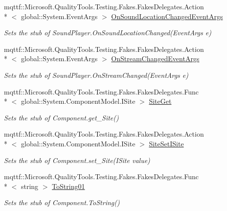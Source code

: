 \begin{DoxyCompactItemize}
mqttf\-::\-Microsoft.\-Quality\-Tools.\-Testing.\-Fakes.\-Fakes\-Delegates.\-Action\\*
$<$ global\-::\-System.\-Event\-Args $>$ \hyperlink{class_system_1_1_media_1_1_fakes_1_1_stub_sound_player_aec86b91a0eb444e299560a898fdcaa4c}{On\-Sound\-Location\-Changed\-Event\-Args}
\begin{DoxyCompactList}\small\item\em Sets the stub of Sound\-Player.\-On\-Sound\-Location\-Changed(\-Event\-Args e)\end{DoxyCompactList}\item 
mqttf\-::\-Microsoft.\-Quality\-Tools.\-Testing.\-Fakes.\-Fakes\-Delegates.\-Action\\*
$<$ global\-::\-System.\-Event\-Args $>$ \hyperlink{class_system_1_1_media_1_1_fakes_1_1_stub_sound_player_a680549744b5cd2e0d578aedaf750e229}{On\-Stream\-Changed\-Event\-Args}
\begin{DoxyCompactList}\small\item\em Sets the stub of Sound\-Player.\-On\-Stream\-Changed(\-Event\-Args e)\end{DoxyCompactList}\item 
mqttf\-::\-Microsoft.\-Quality\-Tools.\-Testing.\-Fakes.\-Fakes\-Delegates.\-Func\\*
$<$ global\-::\-System.\-Component\-Model.\-I\-Site $>$ \hyperlink{class_system_1_1_media_1_1_fakes_1_1_stub_sound_player_aa1edf1cb536d521b813b41f70039a644}{Site\-Get}
\begin{DoxyCompactList}\small\item\em Sets the stub of Component.\-get\-\_\-\-Site()\end{DoxyCompactList}\item 
mqttf\-::\-Microsoft.\-Quality\-Tools.\-Testing.\-Fakes.\-Fakes\-Delegates.\-Action\\*
$<$ global\-::\-System.\-Component\-Model.\-I\-Site $>$ \hyperlink{class_system_1_1_media_1_1_fakes_1_1_stub_sound_player_aa23ba87f9cd29af144dddce337b3127d}{Site\-Set\-I\-Site}
\begin{DoxyCompactList}\small\item\em Sets the stub of Component.\-set\-\_\-\-Site(\-I\-Site value)\end{DoxyCompactList}\item 
mqttf\-::\-Microsoft.\-Quality\-Tools.\-Testing.\-Fakes.\-Fakes\-Delegates.\-Func\\*
$<$ string $>$ \hyperlink{class_system_1_1_media_1_1_fakes_1_1_stub_sound_player_a3686ecc06d366e84574847a8baf11ebe}{To\-String01}
\begin{DoxyCompactList}\small\item\em Sets the stub of Component.\-To\-String()\end{DoxyCompactList}\end{DoxyCompactItemize}

